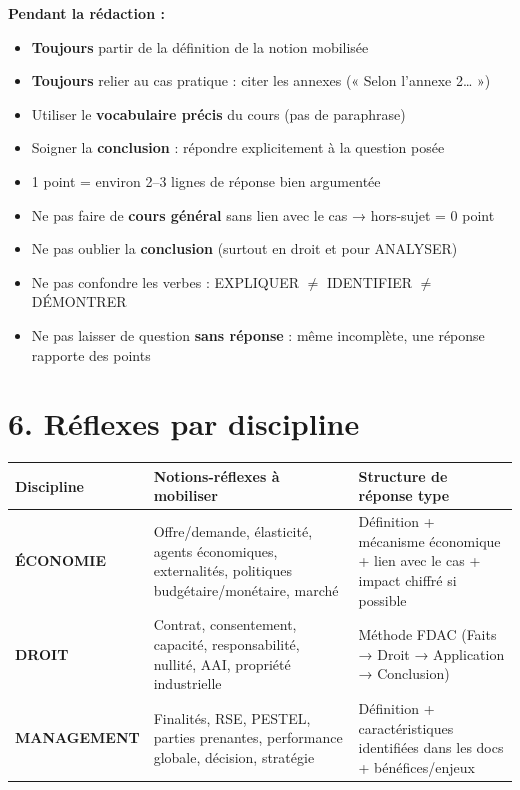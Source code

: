 \documentclass[11pt,a4paper]{article}
\begin{document}
\vspace{4pt}
\begin{tipbox}
\textbf{Pendant la rédaction :}
\begin{itemize}
  \item \textbf{Toujours} partir de la définition de la notion mobilisée
  \item \textbf{Toujours} relier au cas pratique : citer les annexes (« Selon l'annexe 2… »)
  \item Utiliser le \textbf{vocabulaire précis} du cours (pas de paraphrase)
  \item Soigner la \textbf{conclusion} : répondre explicitement à la question posée
  \item 1 point = environ 2--3 lignes de réponse bien argumentée
\end{itemize}
\end{tipbox}

\vspace{4pt}
\begin{alertbox}
\begin{itemize}
  \item Ne pas faire de \textbf{cours général} sans lien avec le cas → hors-sujet = 0 point
  \item Ne pas oublier la \textbf{conclusion} (surtout en droit et pour ANALYSER)
  \item Ne pas confondre les verbes : EXPLIQUER $\neq$ IDENTIFIER $\neq$ DÉMONTRER
  \item Ne pas laisser de question \textbf{sans réponse} : même incomplète, une réponse rapporte des points
\end{itemize}
\end{alertbox}

\section*{\textcolor{mainColor}{6. Réflexes par discipline}}

\begin{center}
\begin{tabular}{|l|p{5.5cm}|p{5.5cm}|}
\hline
\textbf{Discipline} & \textbf{Notions-réflexes à mobiliser} & \textbf{Structure de réponse type} \\
\hline
\textcolor{ecoColor}{\textbf{ÉCONOMIE}} &
Offre/demande, élasticité, agents économiques, externalités, politiques budgétaire/monétaire, marché &
Définition + mécanisme économique + lien avec le cas + impact chiffré si possible \\
\hline
\textcolor{droitColor}{\textbf{DROIT}} &
Contrat, consentement, capacité, responsabilité, nullité, AAI, propriété industrielle &
Méthode FDAC (Faits → Droit → Application → Conclusion) \\
\hline
\textcolor{manaColor}{\textbf{MANAGEMENT}} &
Finalités, RSE, PESTEL, parties prenantes, performance globale, décision, stratégie &
Définition + caractéristiques identifiées dans les docs + bénéfices/enjeux \\
\hline
\end{tabular}
\end{center}
\end{document}
